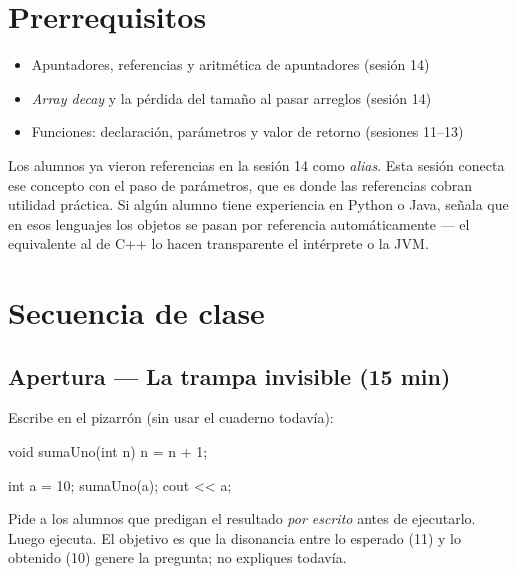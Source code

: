 \documentclass[12pt, oneside]{article}
\begin{document}
\section{Prerrequisitos}

\begin{itemize}
  \item Apuntadores, referencias y aritmética de apuntadores (sesión 14)
  \item \textit{Array decay} y la pérdida del tamaño al pasar arreglos (sesión 14)
  \item Funciones: declaración, parámetros y valor de retorno (sesiones 11--13)
\end{itemize}

\begin{notaprofesor}
  Los alumnos ya vieron referencias en la sesión 14 como \textit{alias}. Esta sesión
  conecta ese concepto con el paso de parámetros, que es donde las referencias cobran
  utilidad práctica. Si algún alumno tiene experiencia en Python o Java, señala que en
  esos lenguajes los objetos se pasan por referencia automáticamente — el equivalente
  al  de C++ lo hacen transparente el intérprete o la JVM.
\end{notaprofesor}

\section{Secuencia de clase}

\subsection{Apertura — La trampa invisible (15 min)}

Escribe en el pizarrón (sin usar el cuaderno todavía):

\begin{codigo}
void sumaUno(int n) { n = n + 1; }

int a = 10;
sumaUno(a);
cout << a;
\end{codigo}

Pide a los alumnos que predigan el resultado \textit{por escrito} antes de
ejecutarlo. Luego ejecuta. El objetivo es que la disonancia entre lo esperado
(11) y lo obtenido (10) genere la pregunta; no expliques todavía.
\end{document}
